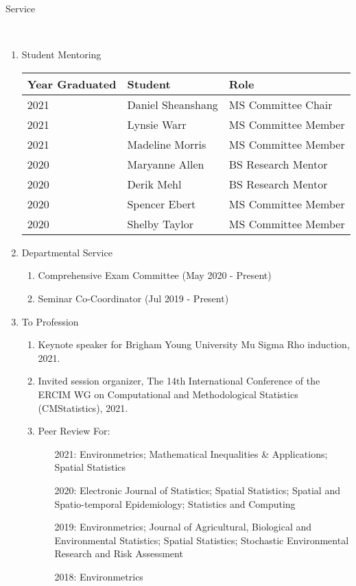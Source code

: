 \documentclass[12pt]{article}
\newcommand{\head}[1]{ %
    \bigskip %
    \begin{large}\begin{bf}{#1}\end{bf}\end{large} %

    \ \\ [-1.3cm] %

    \hrulefill}
\begin{document}
\head{Service}
\begin{enumerate}[label=$\bullet$]

\item Student Mentoring

\begin{table}[H]
\centering
\begin{tabular}{lll}
  \hline
Year Graduated & Student & Role \\ 
  \hline
2021  & Daniel Sheanshang & MS Committee Chair  \\ 
2021  & Lynsie Warr & MS Committee Member  \\ 
2021  & Madeline Morris & MS Committee Member  \\ 
2020  & Maryanne Allen & BS Research Mentor  \\ 
2020  & Derik Mehl & BS Research Mentor \\ 
2020  & Spencer Ebert & MS Committee Member  \\ 
2020  & Shelby Taylor & MS Committee Member  \\ 
   \hline
\end{tabular}
\end{table}


\item Departmental Service
\begin{enumerate}[label=$\cdot$]
\item Comprehensive Exam Committee (May 2020 - Present)
\item Seminar Co-Coordinator (Jul 2019 - Present)
\end{enumerate}
\item To Profession



\begin{enumerate}[label=$\cdot$]
\item Keynote speaker for Brigham Young University Mu Sigma Rho induction, 2021.
\item Invited session organizer, The 14th International Conference of the ERCIM WG on Computational and Methodological Statistics (CMStatistics), 2021.
\item Peer Review For:
\begin{enumerate}
\item[2021:] Environmetrics; Mathematical Inequalities \& Applications; Spatial Statistics
\item[2020:] Electronic Journal of Statistics; Spatial Statistics; Spatial and Spatio-temporal Epidemiology; Statistics and Computing
\item[2019:] Environmetrics; Journal of Agricultural, Biological and Environmental Statistics; Spatial Statistics; Stochastic Environmental Research and Risk Assessment 
\item[2018:] Environmetrics 
\end{enumerate}

\end{enumerate}
\end{enumerate}
\end{document}
